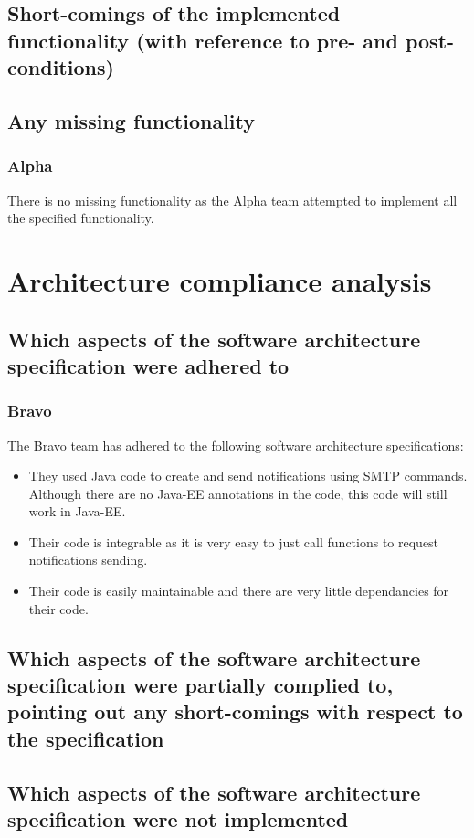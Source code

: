 \documentclass{article}
\begin{document}
\subsection{Short-comings of the implemented functionality (with reference to pre- and post-conditions)}


\subsection{Any missing functionality}
\subsubsection{Alpha}
There is no missing functionality as the Alpha team attempted to implement all the specified functionality.


\section{Architecture compliance analysis}
\subsection{Which aspects of the software architecture specification were adhered to}
\subsubsection{Bravo}
The Bravo team has adhered to the following software architecture specifications:
\begin{itemize}
	\item They used Java code to create and send notifications using SMTP commands. Although there are no Java-EE annotations in the code, this code will still work in Java-EE.
	\item Their code is integrable as it is very easy to just call functions to request notifications sending.
	\item Their code is easily maintainable and there are very little dependancies for their code.
\end{itemize}


\subsection{Which aspects of the software architecture specification were partially complied to, pointing out any short-comings with respect to the specification}


\subsection{Which aspects of the software architecture specification were not implemented}



\end{document}
